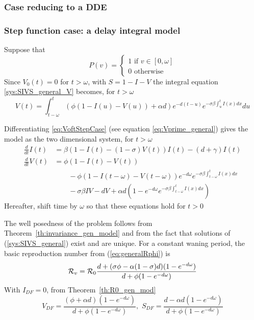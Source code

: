 \documentclass[aspectratio=169]{beamer}\usepackage[]{graphicx}\usepackage[]{xcolor}
\begin{document}
\subsubsection{Case reducing to a DDE}
\begin{frame}\frametitle{Step function case: a delay integral model}
Suppose that
\[ 
P(v)=
\left\{
\begin{array}{l}
1\textrm{ if }v\in[0,\omega] \\
0\textrm{ otherwise} 
\end{array}
\right.
\]
Since $V_0(t)=0$ for $t>\omega$, with $S=1-I-V$ the
integral equation \eqref{sys:SIVS_general_V} becomes, for $t>\omega$
\begin{equation}
  V(t)=\int_{t-\omega}^t(\phi (1-I(u)-V(u))+\alpha d)e^{-d(t-u)}
  e^{-\sigma\beta\int_u^tI(x)dx}du
  \label{eq:VoftStepCase}
\end{equation}
\end{frame}

\begin{frame}
Differentiating \eqref{eq:VoftStepCase} (see equation
\eqref{eq:Vprime_general}) gives the model as the two
dimensional system, for $t>\omega$
\begin{subequations}\label{sys:SIVS_DDE}
\begin{align}
  \frac{d}{dt}I(t) &= 
  \beta(1-I(t)-(1-\sigma)V(t))I(t)-(d+\gamma)I(t) \label{sys:SIVS_DDE_dS} \\
  \frac{d}{dt}V(t) &=
  \phi(1-I(t)-V(t)) \label{sys:SIVS_DDE_dV}\\
  &\qquad-\phi(1-I(t-\omega)-V(t-\omega))e^{-d\omega}
  e^{-\sigma\beta\int_{t-\omega}^t I(x)dx} \nonumber \\
  &\qquad -\sigma\beta IV-dV
  +\alpha d\left(1-e^{-d\omega}e^{-\sigma\beta\int_{t-\omega}^t I(x)dx}
  \right) \nonumber
\end{align}
\end{subequations}
\vfill
Hereafter, shift time by $\omega$ so that these equations hold for $t>0$
\end{frame}


\begin{frame}
The well posedness of the problem follows from
Theorem~\ref{th:invariance_gen_model} and from the fact that solutions
of (\ref{sys:SIVS_general}) exist and are unique.
For a constant waning period, the basic reproduction number from
(\ref{eq:generalRphi}) is
\begin{equation}
 \mathcal{R}_v = \mathcal{R}_0
 \frac{d+(\sigma\phi-\alpha(1-\sigma)d)
 (1-e^{-d\omega})}{d+\phi(1-e^{-d\omega})}
 \label{eq:Rphi}
\end{equation}
\vfill
With $I_{DF}=0$, from Theorem~\ref{th:R0_gen_mod}
\begin{equation}
 V_{DF}=\frac{(\phi+\alpha d)(1-e^{-d\omega})}{d+\phi(1-e^{-d\omega})}
,\,\,
S_{DF}=\frac{d-\alpha d(1-e^{-d\omega})}{d+\phi(1-e^{-d\omega})}
 \label{eq:DFE_V}
\end{equation}
\end{frame}
\end{document}
